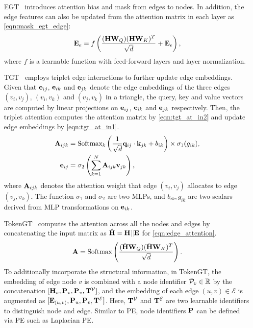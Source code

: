 EGT~\cite{hussain2022global} introduces attention bias and mask from edges to nodes. In addition, the edge features can also be updated from the attention matrix in each layer as \cref{eqn:mask_egt_edge}:
\begin{align}
\label{eqn:mask_egt_edge}
    \BE_{e}=f\left(\frac{(\BH\BW_{Q})(\BH\BW_{K})^T}{\sqrt{d}} + \BE_{e}\right),
\end{align}
where $f$ is a learnable function with feed-forward layers and layer normalization. 

TGT~\cite{hussain2024triplet} employs triplet edge interactions to further update edge embeddings. 
Given that  $\e_{ij}$, $\e_{ik}$ and $\e_{jk}$ denote the edge embeddings of the three edges $(v_i, v_j)$, $(v_i, v_k)$ and $(v_j, v_k)$ in a triangle, the query, key and value vectors are computed by linear projections on $\e_{ij}$, $\e_{ik}$ and $\e_{jk}$ respectively. Then, 
the triplet attention computes the attention matrix by \cref{eqn:tgt_at_in2} and update edge embeddings by \cref{eqn:tgt_at_in1}. 
\begin{align}
   \BA_{ijk} &= \text{Softmax}_k\left(\frac{1}{\sqrt{d}}\mathbf{q}_{ij} \cdot \mathbf{k}_{jk} + b_{ik}\right) \times \sigma_1(g_{ik}) , \label{eqn:tgt_at_in2}\\
   \mathbf{e}_{ij} &= \sigma_2\left(\sum_{k=1}^N \BA_{ijk} \mathbf{v}_{jk}\right),
   \label{eqn:tgt_at_in1}
\end{align}
where $\BA_{ijk}$ denotes the attention weight that  edge $(v_i, v_j)$ allocates to edge $(v_j, v_k)$. 
The function $\sigma_1$ and $\sigma_2$ are two MLPs,  and $b_{ik}, g_{ik}$ are two scalars derived from MLP transformations on $\e_{ik}$. 

TokenGT~\cite{TokenGT} computes the attention across all the nodes and edges by concatenating the input matrix as  $\hat{\BH} = \BH || \BE$ for \cref{eqn:edge_attention}. 
\begin{align}
\label{eqn:edge_attention}
    \BA=\text{Softmax}\left(\frac{(\hat{\BH}\BW_{Q})(\hat{\BH}\BW_{K})^T}{\sqrt{d}}\right). 
\end{align}
To additionally incorporate the structural information, in TokenGT, 
the embedding of edge node $v$ is combined with a node identifier $\P_v \in \mathbb{R}$ by the concatenation $[\BH_v, \BP_v, \BP_v, \BT^{\mathcal{V}}]$, and the embedding of each edge $(u, v) \in \mathcal{E}$ is augmented as $[\BE_{(u,v)}, \BP_u, \BP_v, \BT^{\mathcal{E}}]$.
Here, $\BT^{\mathcal{V}}$ and $\BT^{\mathcal{E}}$ are two learnable identifiers to distinguish node and edge. 
Similar to PE, node identifiers $\BP$ can be defined via PE such as Laplacian PE.

